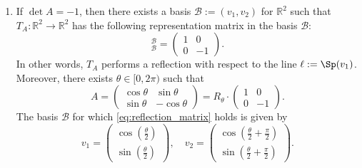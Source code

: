\begin{proposition}
\begin{enumerate}
    \item If $\det A = -1$, then there exists a basis $\mathcal{B} := (v_1, v_2)$ for $\mathbb{R}^2$ such that $T_A \colon \mathbb{R}^2 \to \mathbb{R}^2$ has the following representation matrix in the basis $\mathcal{B}$:
    \begin{equation}
        [T_A]_{\mathcal{B}}^{\mathcal{B}} = \begin{pmatrix} 1 & 0 \\ 0 & -1 \end{pmatrix}. \label{eq:reflection_matrix}
    \end{equation}
    In other words, $T_A$ performs a reflection with respect to the line $\ell := \Sp(v_1)$.
    Moreover, there exists $\theta \in [0, 2\pi)$ such that
    \[ A = \begin{pmatrix} \cos\theta & \sin\theta \\ \sin\theta & -\cos\theta \end{pmatrix} = R_\theta \cdot \begin{pmatrix} 1 & 0 \\ 0 & -1 \end{pmatrix}. \]
    The basis $\mathcal{B}$ for which \eqref{eq:reflection_matrix} holds is given by 
    \[ v_1 = \begin{pmatrix} \cos\left(\frac{\theta}{2}\right) \\ \sin\left(\frac{\theta}{2}\right) \end{pmatrix}, \quad v_2 = \begin{pmatrix} \cos\left(\frac{\theta}{2} + \frac{\pi}{2}\right) \\ \sin\left(\frac{\theta}{2} + \frac{\pi}{2}\right) \end{pmatrix}. \]
\end{enumerate}
\end{proposition}

